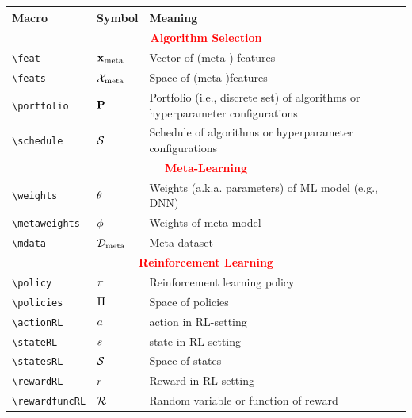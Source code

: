 \documentclass[]{article}
\begin{document}
\begin{table}
	\begin{tabular}{lll}
		\toprule
		Macro & Symbol & Meaning \\
		\midrule
		\multicolumn{3}{c}{\textcolor{red}{\textbf{Algorithm Selection}}}\\
		\verb!\feat! & $\mathbf{x}_{\text{meta}}$ & Vector of (meta-) features\\
		\verb!\feats! & $\mathcal{X}_{\text{meta}}$ & Space of (meta-)features \\
		\verb!\portfolio! & $\mathbf{P}$ & Portfolio (i.e., discrete set) of algorithms or hyperparameter configurations\\
		\verb!\schedule! & $\mathcal{S}$ & Schedule of algorithms or hyperparameter configurations\\
		\midrule
		\multicolumn{3}{c}{\textcolor{red}{\textbf{Meta-Learning}}}\\
		\verb!\weights! & $\theta$ & Weights (a.k.a. parameters) of ML model (e.g., DNN)\\
		\verb!\metaweights! & $\phi$ & Weights of meta-model\\
    \verb!\mdata! & $\mathcal{D}_{\text{meta}}$ & Meta-dataset\\
		\midrule
		\multicolumn{3}{c}{\textcolor{red}{\textbf{Reinforcement Learning}}}\\
		\verb!\policy! & $\pi$ & Reinforcement learning policy\\
		\verb!\policies! & $\Pi$ & Space of policies\\
		\verb!\actionRL! & $a$ & action in RL-setting\\
		\verb!\stateRL! & $s$ & state in RL-setting\\
		\verb!\statesRL! & $\mathcal{S}$ & Space of states\\
		\verb!\rewardRL! & $r$ & Reward in RL-setting\\
		\verb!\rewardfuncRL! & $\mathcal{R}$ & Random variable or function of reward\\
		\bottomrule
	\end{tabular}
\end{table}
\end{document}

